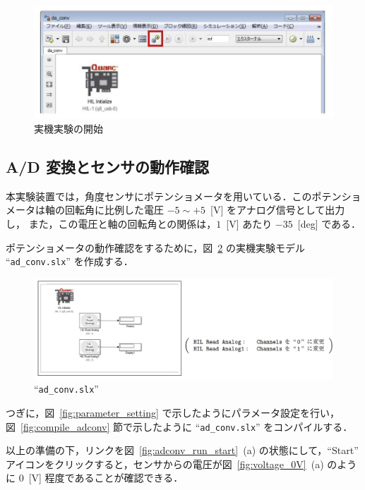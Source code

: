        \begin{figure}[H]
            \centering
            \includegraphics[width=0.85\linewidth]{figure/experiment_start.pdf}
            \caption{実機実験の開始}
            \label{fig:experiment_start}
        \end{figure}
        
        \subsection{A/D 変換とセンサの動作確認}

        本実験装置では，角度センサにポテンショメータを用いている．このポテンショメータは軸の回転角に比例した電圧 $-5 \sim +5$~[V] をアナログ信号として出力し，
        また，この電圧と軸の回転角との関係は，$1$~[V] あたり $-35$~[deg] である．
        
        ポテンショメータの動作確認をするために，図~\ref{fig:ad_conv_model} の実機実験モデル “\texttt{ad\_conv.slx}” を作成する．
        
        \begin{figure}[H]
            \centering
            \includegraphics[width=0.8\linewidth]{figure/ad_conv_model.pdf}
            \caption{“\texttt{ad\_conv.slx}”}
            \label{fig:ad_conv_model}
        \end{figure}
        
        つぎに，図~\ref{fig:parameter_setting} で示したようにパラメータ設定を行い，図~\ref{fig:compile_adconv} 節で示したように “\texttt{ad\_conv.slx}” をコンパイルする．

        以上の準備の下，リンクを図~\ref{fig:adconv_run_start}~(a) の状態にして，“Start” アイコンをクリックすると，センサからの電圧が図~\ref{fig:voltage_0V}~(a) のように $0$~[V] 程度であることが確認できる．
        
